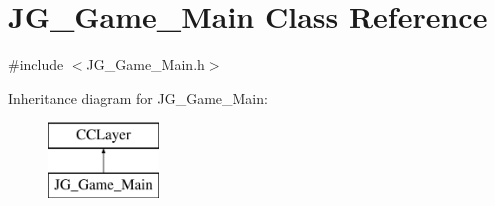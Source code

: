 \hypertarget{class_j_g___game___main}{\section{J\-G\-\_\-\-Game\-\_\-\-Main Class Reference}
\label{class_j_g___game___main}
}


{\ttfamily \#include $<$J\-G\-\_\-\-Game\-\_\-\-Main.\-h$>$}

Inheritance diagram for J\-G\-\_\-\-Game\-\_\-\-Main\-:\begin{figure}[H]
\begin{center}
\leavevmode
\includegraphics[height=2.000000cm]{class_j_g___game___main}
\end{center}
\end{figure}
